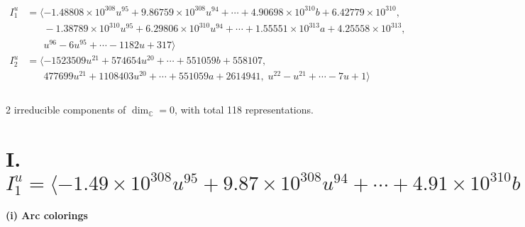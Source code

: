 \documentclass[1p]{elsarticle_modified}
\theoremstyle{definition}
\begin{document}
\begin{align*}
I^u_{1}&=\langle 
-1.48808\times10^{308} u^{95}+9.86759\times10^{308} u^{94}+\cdots+4.90698\times10^{310} b+6.42779\times10^{310},\\
\phantom{I^u_{1}}&\phantom{= \langle  }-1.38789\times10^{310} u^{95}+6.29806\times10^{310} u^{94}+\cdots+1.55551\times10^{313} a+4.25558\times10^{313},\\
\phantom{I^u_{1}}&\phantom{= \langle  }u^{96}-6 u^{95}+\cdots-1182 u+317\rangle \\
I^u_{2}&=\langle 
-1523509 u^{21}+574654 u^{20}+\cdots+551059 b+558107,\\
\phantom{I^u_{2}}&\phantom{= \langle  }477699 u^{21}+1108403 u^{20}+\cdots+551059 a+2614941,\;u^{22}- u^{21}+\cdots-7 u+1\rangle \\
\\
\end{align*}
\raggedright * 2 irreducible components of $\dim_{\mathbb{C}}=0$, with total 118 representations.\\
\newpage
\renewcommand{\arraystretch}{1}
\centering \section*{I. $I^u_{1}= \langle -1.49\times10^{308} u^{95}+9.87\times10^{308} u^{94}+\cdots+4.91\times10^{310} b+6.43\times10^{310},\;-1.39\times10^{310} u^{95}+6.30\times10^{310} u^{94}+\cdots+1.56\times10^{313} a+4.26\times10^{313},\;u^{96}-6 u^{95}+\cdots-1182 u+317 \rangle$}
\flushleft \textbf{(i) Arc colorings}\\
\end{document}

